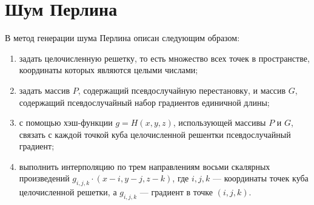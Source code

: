 
\chapter{Шум Перлина}


	


В \cite{tandm}\cite{perlin}\cite{impperlin} метод генерации шума Перлина описан следующим образом:

\begin{enumerate}
	\item задать целочисленную решетку, то есть множество всех точек в пространстве, координаты которых являются целыми числами;
	\item задать массив $P$, содержащий псевдослучайную перестановку, и массив $G$, содержащий псевдослучайный набор градиентов единичной длины;
	\item с помощью хэш-функции $g = H(x, y, z)$, использующей массивы $P$ и $G$, связать с каждой точкой куба целочисленной решентки псевдослучайный градиент;
	\item выполнить интерполяцию по трем направлениям восьми скалярных произведений $g_{i, j, k} \cdot (x - i, y - j, z - k)$, где $i, j, k$  --- координаты точек куба целочисленной решетки, а $g_{i, j, k}$ --- градиент в точке $(i, j, k)$.
\end{enumerate}

